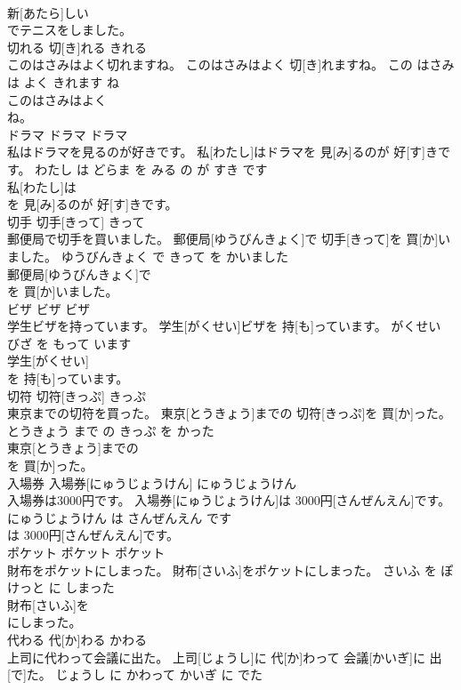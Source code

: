 \documentclass[8pt]{extreport}
\begin{document}
\begin{CJK}{UTF8}{min}
\\	新[あたら]しい
\\	でテニスをしました。			
\\	切れる	切[き]れる	きれる	
\\	このはさみはよく切れますね。	このはさみはよく 切[き]れますね。	この はさみ は よく きれます ね	
\\	このはさみはよく
\\	ね。			
\\	ドラマ	ドラマ	ドラマ	
\\	私はドラマを見るのが好きです。	私[わたし]はドラマを 見[み]るのが 好[す]きです。	わたし は どらま を みる の が すき です	
\\	私[わたし]は
\\	を 見[み]るのが 好[す]きです。			
\\	切手	切手[きって]	きって	
\\	郵便局で切手を買いました。	郵便局[ゆうびんきょく]で 切手[きって]を 買[か]いました。	ゆうびんきょく で きって を かいました	
\\	郵便局[ゆうびんきょく]で
\\	を 買[か]いました。			
\\	ビザ	ビザ	ビザ	
\\	学生ビザを持っています。	学生[がくせい]ビザを 持[も]っています。	がくせい びざ を もって います	
\\	学生[がくせい]
\\	を 持[も]っています。			
\\	切符	切符[きっぷ]	きっぷ	
\\	東京までの切符を買った。	東京[とうきょう]までの 切符[きっぷ]を 買[か]った。	とうきょう まで の きっぷ を かった	
\\	東京[とうきょう]までの
\\	を 買[か]った。			
\\	入場券	入場券[にゅうじょうけん]	にゅうじょうけん	
\\	入場券は3000円です。	入場券[にゅうじょうけん]は 3000円[さんぜんえん]です。	にゅうじょうけん は さんぜんえん です	
\\	は 3000円[さんぜんえん]です。			
\\	ポケット	ポケット	ポケット	
\\	財布をポケットにしまった。	財布[さいふ]をポケットにしまった。	さいふ を ぽけっと に しまった	
\\	財布[さいふ]を
\\	にしまった。			
\\	代わる	代[か]わる	かわる	
\\	上司に代わって会議に出た。	上司[じょうし]に 代[か]わって 会議[かいぎ]に 出[で]た。	じょうし に かわって かいぎ に でた	

\end{CJK}
\end{document}
